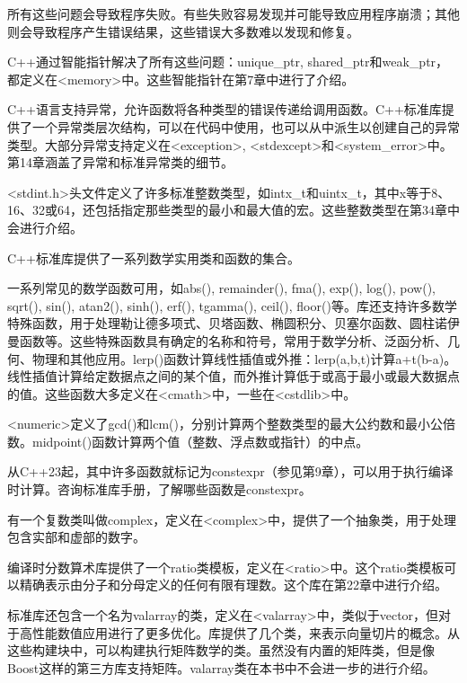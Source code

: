 所有这些问题会导致程序失败。有些失败容易发现并可能导致应用程序崩溃；其他则会导致程序产生错误结果，这些错误大多数难以发现和修复。

C++通过智能指针解决了所有这些问题：unique\_ptr, shared\_ptr和weak\_ptr，都定义在<memory>中。这些智能指针在第7章中进行了介绍。


C++语言支持异常，允许函数将各种类型的错误传递给调用函数。C++标准库提供了一个异常类层次结构，可以在代码中使用，也可以从中派生以创建自己的异常类型。大部分异常支持定义在<exception>, <stdexcept>和<system\_error>中。第14章涵盖了异常和标准异常类的细节。


<stdint.h>头文件定义了许多标准整数类型，如intx\_t和uintx\_t，其中x等于8、16、32或64，还包括指定那些类型的最小和最大值的宏。这些整数类型在第34章中会进行介绍。


C++标准库提供了一系列数学实用类和函数的集合。

一系列常见的数学函数可用，如abs(), remainder(), fma(), exp(), log(), pow(), sqrt(), sin(), atan2(), sinh(), erf(), tgamma(), ceil(), floor()等。库还支持许多数学特殊函数，用于处理勒让德多项式、贝塔函数、椭圆积分、贝塞尔函数、圆柱诺伊曼函数等。这些特殊函数具有确定的名称和符号，常用于数学分析、泛函分析、几何、物理和其他应用。lerp()函数计算线性插值或外推：lerp(a,b,t)计算a+t(b-a)。线性插值计算给定数据点之间的某个值，而外推计算低于或高于最小或最大数据点的值。这些函数大多定义在<cmath>中，一些在<cstdlib>中。

<numeric>定义了gcd()和lcm()，分别计算两个整数类型的最大公约数和最小公倍数。midpoint()函数计算两个值（整数、浮点数或指针）的中点。

从C++23起，其中许多函数就标记为constexpr（参见第9章），可以用于执行编译时计算。咨询标准库手册，了解哪些函数是constexpr。

有一个复数类叫做complex，定义在<complex>中，提供了一个抽象类，用于处理包含实部和虚部的数字。

编译时分数算术库提供了一个ratio类模板，定义在<ratio>中。这个ratio类模板可以精确表示由分子和分母定义的任何有限有理数。这个库在第22章中进行介绍。

标准库还包含一个名为valarray的类，定义在<valarray>中，类似于vector，但对于高性能数值应用进行了更多优化。库提供了几个类，来表示向量切片的概念。从这些构建块中，可以构建执行矩阵数学的类。虽然没有内置的矩阵类，但是像Boost这样的第三方库支持矩阵。valarray类在本书中不会进一步的进行介绍。

